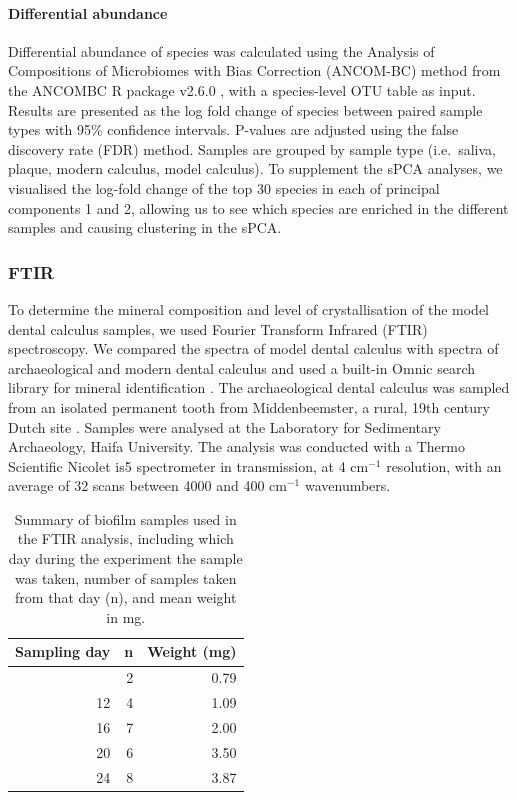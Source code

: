 \documentclass[10pt,a4paper]{article}
\begin{document}
\paragraph{Differential abundance}\label{differential-abundance}

Differential abundance of species was calculated using the Analysis of
Compositions of Microbiomes with Bias Correction (ANCOM-BC) method from
the ANCOMBC R package v2.6.0 \citep{linANCOMBC2020}, with a
species-level OTU table as input. Results are presented as the log fold
change of species between paired sample types with 95\% confidence
intervals. P-values are adjusted using the false discovery rate (FDR)
method. Samples are grouped by sample type (i.e.~saliva, plaque, modern
calculus, model calculus). To supplement the sPCA analyses, we
visualised the log-fold change of the top 30 species in each of
principal components 1 and 2, allowing us to see which species are
enriched in the different samples and causing clustering in the sPCA.

\subsubsection{FTIR}\label{ftir}

To determine the mineral composition and level of crystallisation of the
model dental calculus samples, we used Fourier Transform Infrared (FTIR)
spectroscopy. We compared the spectra of model dental calculus with
spectra of archaeological and modern dental calculus and used a built-in
Omnic search library for mineral identification
\citep{weinerInfraredSpectroscopy2010, mentzerDistributionAuthigenic2014}.
The archaeological dental calculus was sampled from an isolated
permanent tooth from Middenbeemster, a rural, 19th century Dutch site
\citep{lemmersMiddenbeemster2013}. Samples were analysed at the
Laboratory for Sedimentary Archaeology, Haifa University. The analysis
was conducted with a Thermo Scientific Nicolet is5 spectrometer in
transmission, at 4 cm\(^{-1}\) resolution, with an average of 32 scans
between 4000 and 400 cm\(^{-1}\) wavenumbers.

\begin{longtable}[]{@{}rrr@{}}

\caption{\label{tbl-ftir-byoc}Summary of biofilm samples used in the
FTIR analysis, including which day during the experiment the sample was
taken, number of samples taken from that day (n), and mean weight in
mg.}

\tabularnewline

\toprule\noalign{}
Sampling day & n & Weight (mg) \\
\midrule\noalign{}
\endhead
\bottomrule\noalign{}
\endlastfoot
7 & 2 & 0.79 \\
12 & 4 & 1.09 \\
16 & 7 & 2.00 \\
20 & 6 & 3.50 \\
24 & 8 & 3.87 \\

\end{longtable}
\end{document}
